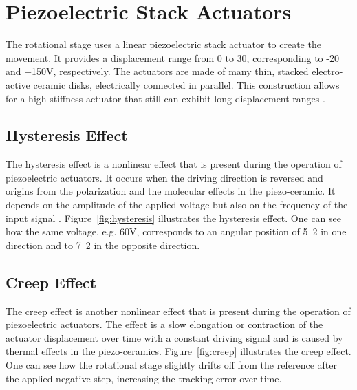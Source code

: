 \section{Piezoelectric Stack Actuators}
The rotational stage uses a linear piezoelectric stack actuator to create the movement. It provides a displacement range from 0 to \unit{30}{\micro\meter}, corresponding to -20 and +150V, respectively. The actuators are made of many thin, stacked electro-active ceramic disks, electrically connected in parallel. This construction allows for a high stiffness actuator that still can exhibit long displacement ranges \cite{Piezo:2008}.

\subsection{Hysteresis Effect}
The hysteresis effect is a nonlinear effect that is present during the operation of piezoelectric actuators. It occurs when the driving direction is reversed and origins from the polarization and the molecular effects in the piezo-ceramic. It depends on the amplitude of the applied voltage but also on the frequency of the input signal \cite{Qingson:2016}. Figure~\ref{fig:hysteresis} illustrates the hysteresis effect. One can see how the same voltage, e.g. 60V, corresponds to an angular position of \unit{5.2}{\micro\rad} in one direction and to \unit{7.2}{\micro\rad} in the opposite direction.

\subsection{Creep Effect}
The creep effect is another nonlinear effect that is present during the operation of piezoelectric actuators. The effect is a slow elongation or contraction of the actuator displacement over time with a constant driving signal and is caused by thermal effects in the piezo-ceramics. Figure~\ref{fig:creep} illustrates the creep effect. One can see how the rotational stage slightly drifts off from the reference after the applied negative step, increasing the tracking error over time.

